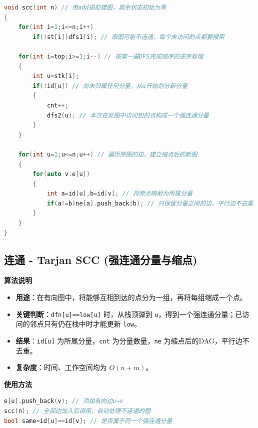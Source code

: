 \documentclass[10pt,landscape,a4paper]{article}
\begin{document}
\begin{multicols*}{3}
\begin{lstlisting}[language=C++]
void scc(int n) // 用add提前建图，其余状态初始为零
{
    for(int i=1;i<=n;i++)
        if(!st[i])dfs1(i); // 原图可能不连通，每个未访问的点都要搜索

    for(int i=top;i>=1;i--) // 按第一遍DFS完成顺序的逆序处理
    {
        int u=stk[i];
        if(!id[u]) // 尚未归属任何分量，从u开始划分新分量
        {
            cnt++;
            dfs2(u); // 本次在反图中访问到的点构成一个强连通分量
        }
    }

    for(int u=1;u<=n;u++) // 遍历原图的边，建立缩点后的新图
    {
        for(auto v:e[u])
        {
            int a=id[u],b=id[v]; // 将原点映射为所属分量
            if(a!=b)ne[a].push_back(b); // 只保留分量之间的边，平行边不去重
        }
    }
}
\end{lstlisting}
\subsection*{连通 - Tarjan SCC (强连通分量与缩点)}
\par\addvspace{0.7ex}\noindent\textbf{算法说明}\par\nobreak
\begin{itemize}
\item \textbf{用途}：在有向图中，将能够互相到达的点分为一组，再将每组缩成一个点。
\item \textbf{关键判断}：\texttt{d\allowbreak{}f\allowbreak{}n\allowbreak{}[\allowbreak{}u\allowbreak{}]\allowbreak{}=\allowbreak{}=\allowbreak{}l\allowbreak{}o\allowbreak{}w\allowbreak{}[\allowbreak{}u\allowbreak{}]} 时，从栈顶弹到 \texttt{u}，得到一个强连通分量；已访问的邻点只有仍在栈中时才能更新 \texttt{l\allowbreak{}o\allowbreak{}w}。
\item \textbf{结果}：\texttt{i\allowbreak{}d\allowbreak{}[\allowbreak{}u\allowbreak{}]} 为所属分量，\texttt{c\allowbreak{}n\allowbreak{}t} 为分量数量，\texttt{n\allowbreak{}e} 为缩点后的DAG，平行边不去重。
\item \textbf{复杂度}：时间、工作空间均为 $O(n+m)$。
\end{itemize}
\par\addvspace{0.7ex}\noindent\textbf{使用方法}\par\nobreak
\begin{lstlisting}[language=C++,numbers=none,basicstyle=\footnotesize\ttfamily]
e[u].push_back(v); // 添加有向边u→v
scc(n); // 全部边加入后调用，自动处理不连通的图
bool same=id[u]==id[v]; // 是否属于同一个强连通分量
\end{lstlisting}


\end{multicols*}
\end{document}
